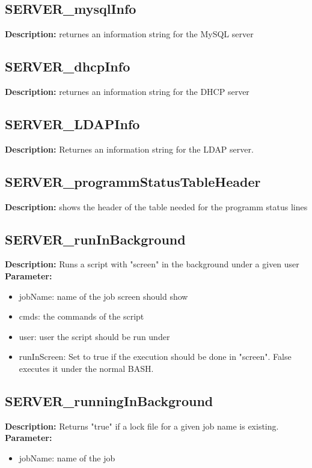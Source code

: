 \subsection{SERVER\_mysqlInfo}
\textbf{Description:} returnes an information string for the MySQL server\\

\subsection{SERVER\_dhcpInfo}
\textbf{Description:} returnes an information string for the DHCP server\\

\subsection{SERVER\_LDAPInfo}
\textbf{Description:} Returnes an information string for the LDAP server.\\

\subsection{SERVER\_programmStatusTableHeader}
\textbf{Description:} shows the header of the table needed for the programm status lines\\

\subsection{SERVER\_runInBackground}
\textbf{Description:} Runs a script with "screen" in the background under a given user\\
\textbf{Parameter:}
\begin{itemize}
\item jobName: name of the job screen should show
\item cmds: the commands of the script 
\item user: user the script should be run under
\item runInScreen: Set to true if the execution should be done in "screen". False executes it under the normal BASH.
\end{itemize}

\subsection{SERVER\_runningInBackground}
\textbf{Description:} Returns "true" if a lock file for a given job name is existing.\\
\textbf{Parameter:}
\begin{itemize}
\item jobName: name of the job
\end{itemize}

